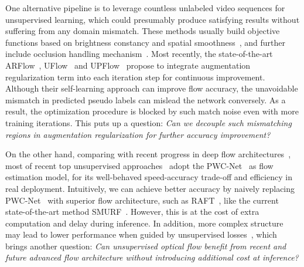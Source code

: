 \documentclass[lettersize,journal]{IEEEtran}
\begin{document}
One alternative pipeline is to leverage countless unlabeled video sequences for unsupervised learning, which could presumably produce satisfying results without suffering from any domain mismatch. These methods usually build objective functions based on brightness constancy and spatial smoothness~\cite{10.1007/978-3-319-49409-8_1,10.5555/3298239.3298457}, and further include occlusion handling mechanism~\cite{Meister:2018:UUL,8578611}. Most recently, the state-of-the-art ARFlow~\cite{Liu_2020_CVPR}, UFlow~\cite{10.1007/978-3-030-58536-5_33} and UPFlow~\cite{Luo_2021_CVPR} propose to integrate augmentation regularization term into each iteration step for continuous improvement. Although their self-learning approach can improve flow accuracy, the unavoidable mismatch in predicted pseudo labels can mislead the network conversely. As a result, the optimization procedure is blocked by such match noise even with more training iterations. This puts up a question: \textit{Can we decouple such mismatching regions in augmentation regularization for further accuracy improvement?}

\IEEEpubidadjcol

On the other hand, comparing with recent progress in deep flow architectures~\cite{teed2020raft,NEURIPS2020_add5aebf}, most of recent top unsupervised approaches~\cite{Liu:2019:SelFlow,Liu_2020_CVPR,10.1007/978-3-030-58586-0_11,10.1007/978-3-030-58536-5_33} adopt the PWC-Net~\cite{8579029} as flow estimation model, for its well-behaved speed-accuracy trade-off and efficiency in real deployment. Intuitively, we can achieve better accuracy by naively replacing PWC-Net~\cite{8579029} with superior flow architecture, such as RAFT~\cite{teed2020raft}, like the current state-of-the-art method SMURF~\cite{Stone_2021_CVPR}. However, this is at the cost of extra computation and delay during inference. In addition, more complex structure may lead to lower performance when guided by unsupervised losses~\cite{10.1007/978-3-030-58536-5_33}, which brings another question: \textit{Can unsupervised optical flow benefit from recent and future advanced flow architecture without introducing additional cost at inference?}
\end{document}
